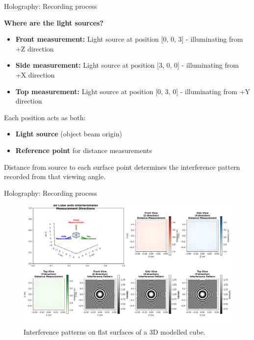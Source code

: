 \documentclass{beamer}
\begin{document}
\begin{frame}{Holography: Recording process}

\textbf{Where are the light sources?}
\begin{itemize}
    \item \textbf{Front measurement:} Light source at position [0, 0, 3] - illuminating from +Z direction
    \item \textbf{Side measurement:} Light source at position [3, 0, 0] - illuminating from +X direction  
    \item \textbf{Top measurement:} Light source at position [0, 3, 0] - illuminating from +Y direction
\end{itemize}

\vspace{0.5em}

Each position acts as both:
\begin{itemize}
    \item \textbf{Light source} (object beam origin)
    \item \textbf{Reference point} for distance measurements
\end{itemize}

\vspace{0.3em}

Distance from source to each surface point determines the interference pattern recorded from that viewing angle.
\end{frame}
\begin{frame}{Holography: Recording process}
    \begin{figure}[h]
        \centering
        \includegraphics[width=1\textwidth]{Figures/cube-holograph.png}
        \caption{Interference patterns on flat surfaces of a 3D modelled cube.}
        \label{fig:cube_holograph}
    \end{figure}
\end{frame}
\end{document}
